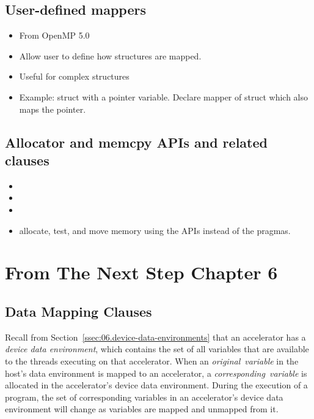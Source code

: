 \subsection{User-defined mappers}
\label{sec:mapper}
\begin{itemize}
  \item From OpenMP 5.0
  \item Allow user to define how structures are mapped.
  \item Useful for complex structures
  \item Example: struct with a pointer variable. Declare mapper of struct which also maps the pointer.
\end{itemize}

\subsection{Allocator and memcpy APIs and related clauses}
\label{sec:alloc_apis}
\begin{itemize}
  \item {}
  \item {}
  \item {}
  \item allocate, test, and move memory using the APIs instead of the pragmas.
\end{itemize}


\section{From The Next Step Chapter 6}
\subsection{Data Mapping Clauses}
\label{sec:06.data-mapping-clauses}

Recall from Section~\ref{ssec:06.device-data-environments} that an accelerator has a
\emph{device data environment}, which contains the set of all variables that are
available to the threads executing on that accelerator.  When an 
\emph{original}~\emph{variable} in the host's data environment is mapped to an accelerator, a
\emph{corresponding}~\emph{variable} is allocated in the accelerator's device data
environment.  During the execution of a program, the set of corresponding
variables in an accelerator's device data environment will change as variables
are mapped and unmapped from it.


